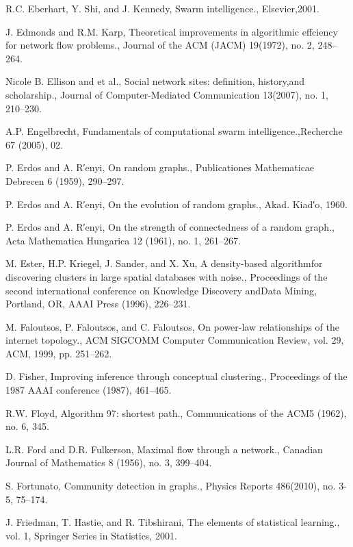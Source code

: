 \begin{thebibliography}{999}
 R.C. Eberhart, Y. Shi, and J. Kennedy, Swarm intelligence., Elsevier,2001.

 J. Edmonds and R.M. Karp, Theoretical improvements in algorithmic effciency for network flow problems., Journal of the ACM (JACM) 19(1972), no. 2, 248–264.

 Nicole B. Ellison and et al., Social network sites: definition, history,and scholarship., Journal of Computer-Mediated Communication 13(2007), no. 1, 210–230.

 A.P. Engelbrecht, Fundamentals of computational swarm intelligence.,Recherche 67 (2005), 02.

 P. Erdos and A. R′enyi, On random graphs., Publicationes Mathematicae Debrecen 6 (1959), 290–297.

 P. Erdos and A. R′enyi, On the evolution of random graphs., Akad. Kiad′o, 1960.

 P. Erdos and A. R′enyi, On the strength of connectedness of a random graph., Acta Mathematica Hungarica 12 (1961), no. 1, 261–267.

 M. Ester, H.P. Kriegel, J. Sander, and X. Xu, A density-based algorithmfor discovering clusters in large spatial databases with noise., Proceedings of the second international conference on Knowledge Discovery andData Mining, Portland, OR, AAAI Press (1996), 226–231.

 M. Faloutsos, P. Faloutsos, and C. Faloutsos, On power-law relationships of the internet topology., ACM SIGCOMM Computer Communication Review, vol. 29, ACM, 1999, pp. 251–262.

 D. Fisher, Improving inference through conceptual clustering., Proceedings of the 1987 AAAI conference (1987), 461–465.

 R.W. Floyd, Algorithm 97: shortest path., Communications of the ACM5 (1962), no. 6, 345.

 L.R. Ford and D.R. Fulkerson, Maximal flow through a network., Canadian Journal of Mathematics 8 (1956), no. 3, 399–404.

 S. Fortunato, Community detection in graphs., Physics Reports 486(2010), no. 3-5, 75–174.

 J. Friedman, T. Hastie, and R. Tibshirani, The elements of statistical learning., vol. 1, Springer Series in Statistics, 2001.


\end{thebibliography}
